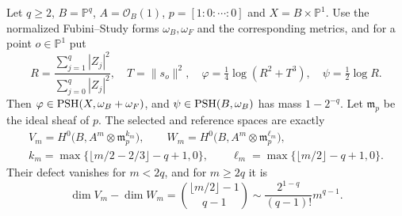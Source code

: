 \begin{example}\label{ex:modified-point-fiber-series}
Let $q\geq2$, $B=\mathbb P^q$, $A=\mathcal O_B(1)$, $p=[1:0:\cdots:0]$ and $X=B\times\mathbb P^1$. Use the normalized Fubini--Study forms $\omega_B,\omega_F$ and the corresponding metrics, and for a point $o\in\mathbb P^1$ put
\[
 R=\frac{\sum_{j=1}^q|Z_j|^2}{\sum_{j=0}^q|Z_j|^2},\quad
 T=\|s_o\|^2,\quad \varphi=\tfrac14\log(R^2+T^3),\quad
 \psi=\tfrac12\log R.
\]
Then $\varphi\in\mathrm{PSH}(X,\omega_B+\omega_F)$, and $\psi\in\mathrm{PSH}(B,\omega_B)$ has mass $1-2^{-q}$. Let $\mathfrak m_p$ be the ideal sheaf of $p$. The selected and reference spaces are exactly
\[
 \begin{gathered}
 V_m=H^0\bigl(B,A^m\otimes\mathfrak m_p^{k_m}\bigr),\qquad
 W_m=H^0\bigl(B,A^m\otimes\mathfrak m_p^{\ell_m}\bigr),\\
 k_m=\max\{\lfloor m/2-2/3\rfloor-q+1,0\},\qquad
 \ell_m=\max\{\lfloor m/2\rfloor-q+1,0\}.
 \end{gathered}
\]
Their defect vanishes for $m<2q$, and for $m\geq2q$ it is
\[
 \dim V_m-\dim W_m=\binom{\lfloor m/2\rfloor-1}{q-1}
       \sim\frac{2^{1-q}}{(q-1)!}m^{q-1}.
\]
\end{example}

